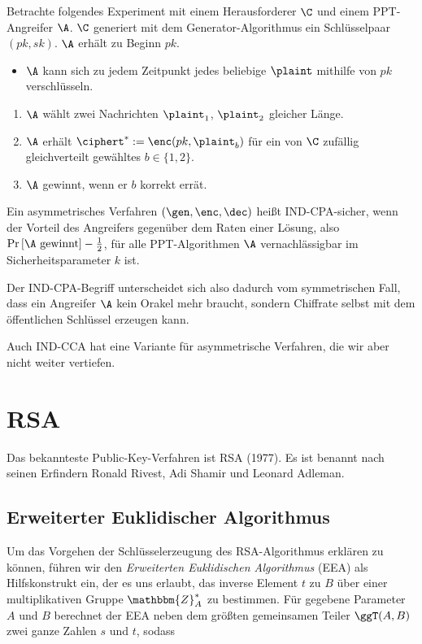 \begin{definition}
  Betrachte folgendes Experiment mit einem Herausforderer $\C$ und einem
  PPT-Angreifer $\A$. $\C$ generiert mit dem Generator-Algorithmus ein
  Schlüsselpaar $(pk, sk)$. $\A$ erhält zu Beginn $pk$.
  \begin{itemize}
  \item $\A$ kann sich zu jedem Zeitpunkt jedes beliebige $\plaint$
    mithilfe von $pk$ verschlüsseln.
  \end{itemize}
  \begin{enumerate}
  \item $\A$ wählt zwei Nachrichten $\plaint_1$, $\plaint_2$ gleicher
    Länge.
  \item $\A$ erhält $\ciphert^{*} := \enc(pk, \plaint_{b})$ für ein von
    $\C$ zufällig gleichverteilt gewähltes $b \in \{1, 2\}$.
  \item $\A$ gewinnt, wenn er $b$ korrekt errät.
  \end{enumerate} 
  Ein asymmetrisches Verfahren $(\gen, \enc, \dec)$ heißt IND-CPA-sicher, wenn der Vorteil des
  Angreifers gegenüber dem Raten einer Lösung, also $\Pr \left[ \A
    \textnormal{ gewinnt} \right] - \frac{1}{2}$, für alle
  PPT-Algorithmen $\A$ vernachlässigbar im Sicherheitsparameter $k$ ist.
\end{definition}

Der IND-CPA-Begriff unterscheidet sich also dadurch vom symmetrischen
Fall, dass ein Angreifer $\A$ kein Orakel mehr braucht, sondern
Chiffrate selbst mit dem öffentlichen Schlüssel erzeugen kann.

Auch IND-CCA hat eine Variante für asymmetrische Verfahren, die wir aber
nicht weiter vertiefen.

\section{RSA}
Das bekannteste Public-Key-Verfahren ist RSA (1977). Es ist benannt nach seinen
Erfindern Ronald Rivest, Adi Shamir und Leonard Adleman.

\subsection{Erweiterter Euklidischer Algorithmus}
\label{ssec:eea}
Um das Vorgehen der Schlüsselerzeugung des RSA-Algorithmus erklären zu
können, führen wir den \emph{Erweiterten Euklidischen Algorithmus} (EEA)
als Hilfskonstrukt ein, der es uns erlaubt, das inverse Element $t$ zu
$B$ über einer multiplikativen Gruppe $\mathbbm{Z}^{\ast}_{A}$ zu
bestimmen. Für gegebene Parameter $A$ und $B$ berechnet der EEA neben
dem größten gemeinsamen Teiler $\ggT(A, B)$ zwei ganze Zahlen $s$ und $t$, sodass 


